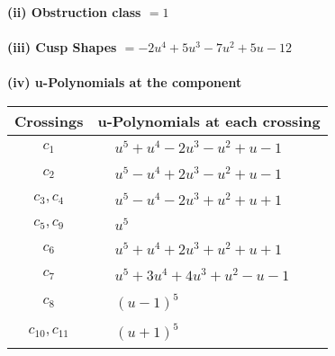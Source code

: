 \documentclass[1p]{elsarticle_modified}
\theoremstyle{definition}
\begin{document}
\flushleft \textbf{(ii) Obstruction class $= 1$}\\~\\
\flushleft \textbf{(iii) Cusp Shapes $= -2 u^4+5 u^3-7 u^2+5 u-12$}\\~\\
\newpage\renewcommand{\arraystretch}{1}
\flushleft \textbf{(iv) u-Polynomials at the component}\newline \\
\begin{tabular}{m{50pt}|m{274pt}}
Crossings & \hspace{64pt}u-Polynomials at each crossing \\
\hline $$\begin{aligned}c_{1}\end{aligned}$$&$\begin{aligned}
&u^5+u^4-2 u^3- u^2+u-1
\end{aligned}$\\
\hline $$\begin{aligned}c_{2}\end{aligned}$$&$\begin{aligned}
&u^5- u^4+2 u^3- u^2+u-1
\end{aligned}$\\
\hline $$\begin{aligned}c_{3},c_{4}\end{aligned}$$&$\begin{aligned}
&u^5- u^4-2 u^3+u^2+u+1
\end{aligned}$\\
\hline $$\begin{aligned}c_{5},c_{9}\end{aligned}$$&$\begin{aligned}
&u^5
\end{aligned}$\\
\hline $$\begin{aligned}c_{6}\end{aligned}$$&$\begin{aligned}
&u^5+u^4+2 u^3+u^2+u+1
\end{aligned}$\\
\hline $$\begin{aligned}c_{7}\end{aligned}$$&$\begin{aligned}
&u^5+3 u^4+4 u^3+u^2- u-1
\end{aligned}$\\
\hline $$\begin{aligned}c_{8}\end{aligned}$$&$\begin{aligned}
&(u-1)^5
\end{aligned}$\\
\hline $$\begin{aligned}c_{10},c_{11}\end{aligned}$$&$\begin{aligned}
&(u+1)^5
\end{aligned}$\\
\hline
\end{tabular}\\~\\
\end{document}
